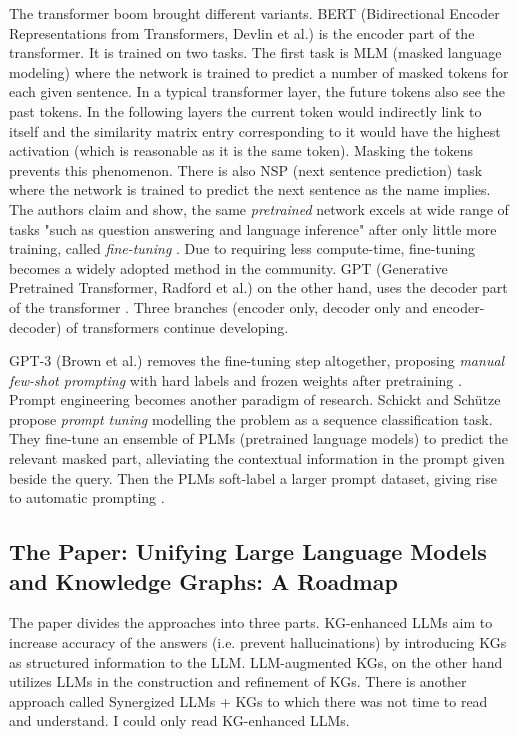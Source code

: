 \documentclass{article}
\begin{document}
The transformer boom brought different variants. BERT (Bidirectional Encoder Representations from Transformers, Devlin et al.) is the encoder part of the transformer. It is trained on two tasks. The first task is MLM (masked language modeling) where the network is trained to predict a number of masked tokens for each given sentence. In a typical transformer layer, the future tokens also see the past tokens. In the following layers the current token would indirectly link to itself and the similarity matrix entry corresponding to it would have the highest activation (which is reasonable as it is the same token). Masking the tokens prevents this phenomenon. There is also NSP (next sentence prediction) task where the network is trained to predict the next sentence as the name implies. The authors claim and show, the same \textit{pretrained} network excels at wide range of tasks "such as question answering and language inference" after only little more training, called \textit{fine-tuning} \cite{devlin_bert_2019}. Due to requiring less compute-time, fine-tuning becomes a widely adopted method in the community. GPT (Generative Pretrained Transformer, Radford et al.) on the other hand, uses the decoder part of the transformer \cite{radford_improving_2018}. Three branches (encoder only, decoder only and encoder-decoder) of transformers continue developing. 

GPT-3 (Brown et al.) removes the fine-tuning step altogether, proposing \textit{manual few-shot prompting} with hard labels and frozen weights after pretraining \cite{brown_language_2020}. Prompt engineering becomes another paradigm of research. Schickt and Schütze propose \textit{prompt tuning} modelling the problem as a sequence classification task. They fine-tune an ensemble of PLMs (pretrained language models) to predict the relevant masked part, alleviating the contextual information in the prompt given beside the query. Then the PLMs soft-label a larger prompt dataset, giving rise to automatic prompting \cite{schick_exploiting_2021}. 

\subsection{The Paper: Unifying Large Language Models and Knowledge Graphs: A Roadmap}\label{kgllm}

The paper divides the approaches into three parts. KG-enhanced LLMs aim to increase accuracy of the answers (i.e. prevent hallucinations) by introducing KGs as structured information to the LLM. LLM-augmented KGs, on the other hand utilizes LLMs in the construction and refinement of KGs. There is another approach called Synergized LLMs + KGs \cite{pan_unifying_2024} to which there was not time to read and understand. I could only read KG-enhanced LLMs.
\end{document}
